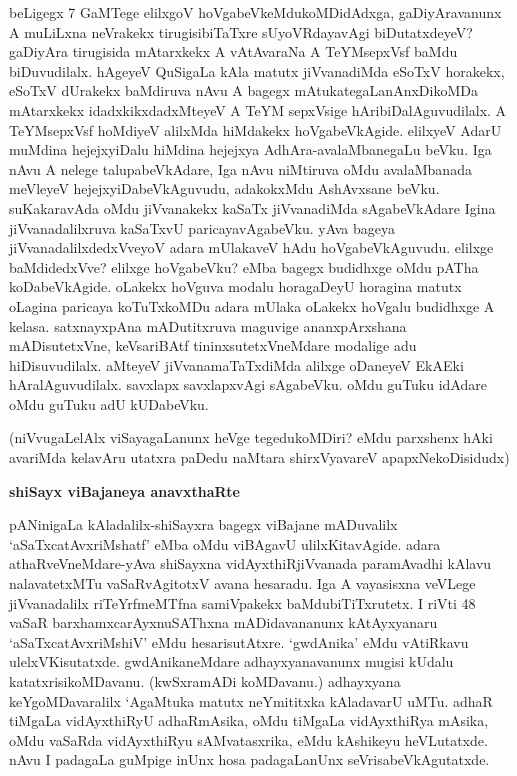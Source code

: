 \noindent
beLigegx 7 GaMTege elilxgoV hoVgabeVkeMdukoMDidAdxga, gaDiyAravanunx A muLiLxna neVrakekx tirugisi\-biTaTxre sUyoVRdayavAgi biDutatxdeyeV? gaDiyAra tirugisida mAtarxkekx A vAtAvaraNa A TeYM\-sepxVsf baMdu biDuvudilalx. hAgeyeV QuSigaLa kAla matutx jiVvanadiMda eSoTxV horakekx, eSoTxV dUrakekx baMdiruva nAvu A bagegx mAtukategaLanAnxDikoMDa mAtarxkekx idadxkikxdadxMteyeV A TeYM sepxVsige hAribiDalAguvudilalx. A TeYMsepxVsf hoMdiyeV alilxMda hiMdakekx hoVgabeVkAgide. elilxyeV AdarU muMdina hejejxyiDalu hiMdina hejejxya AdhAra-avalaMbanegaLu beVku. Iga nAvu A nelege talupa\-beVkAdare, Iga nAvu niMtiruva oMdu avalaMbanada meVleyeV hejejxyiDabeVkAguvudu, ada\-kokxMdu AshAvxsane beVku. suKakaravAda oMdu jiVvanakekx kaSaTx jiVvanadiMda sAgabeVkAdare Igina jiVvana\-dalilx\-ruva kaSaTxvU paricayavAgabeVku. yAva bageya jiVvanadalilxdedxVveyoV adara mUlakaveV hAdu 
hoVga\-beVkA\-guvudu. elilxge baMdidedxVve? elilxge hoVgabeVku? eMba bagegx budidhxge oMdu pATha koDa\-beVkA\-gide. oLakekx hoVguva modalu horagaDeyU horagina matutx oLagina paricaya koTuTx\-koMDu adara mUlaka oLakekx hoVgalu budidhxge A kelasa. satxnayxpAna mADutitxruva maguvige ananxpArxshana mADisu\-tetxVne, keVsariBAtf tininxsutetxVneMdare modalige adu hiDisuvudilalx. aMteyeV jiVvanamaTaTxdiMda alilxge oDaneyeV EkAEki hAralAguvudilalx. savxlapx savxlapxvAgi sAgabeVku. oMdu guTuku idAdare oMdu guTuku adU kUDabeVku.

(niVvugaLelAlx viSayagaLanunx heVge tegedukoMDiri? eMdu parxshenx hAki avariMda kelavAru utatxra paDedu naMtara shirxVyavareV apapxNekoDisidudx)

{\bigskip
\noindent
{\large\bf shiSayx viBajaneya anavxthaRte}}\label{page126}
\medskip

\noindent
pANinigaLa kAladalilx-shiSayxra bagegx viBajane mADuvalilx `aSaTxcatAvxriMshatf' eMba oMdu viBA\-gavU ulilx\-Kita\-vAgide. adara athaRveVneMdare-yAva shiSayxna vidAyxthiRjiVvanada paramAvadhi kAlavu nalava\-tetxMTu vaSaRvAgitotxV avana hesaradu. Iga A vayasisxna veVLege jiVvanadalilx riTeYrfmeMTfna samiVpakekx baMdubiTiTxrutetx. I riVti 48 vaSaR barxhamxcarAyxnuSAThxna mADidavananunx kAtAyxyanaru `aSaTxcatAvxriMshiV' eMdu hesa\-risutAtxre. `gwdAnika' eMdu vAtiRkavu ulelxVKisutatxde. gwdAnikaneMdare adhayxyanavanunx mugisi \-kUdalu katatxrisikoMDavanu. (kwSxramADi koMDavanu.) adhayxyana keYgoMDavaralilx `AgaMtuka matutx neYmi\-titxka kAladavarU uMTu. adhaR tiMgaLa vidAyxthiRyU adhaRmAsika, oMdu tiMgaLa vidAyxthiRya mAsika, oMdu vaSaRda vidAyxthiRyu sAMvatasxrika, eMdu kAshikeyu heVLutatxde. nAvu I pada\-gaLa guMpige inUnx hosa padagaLanUnx seVrisabeVkAgutatxde.

